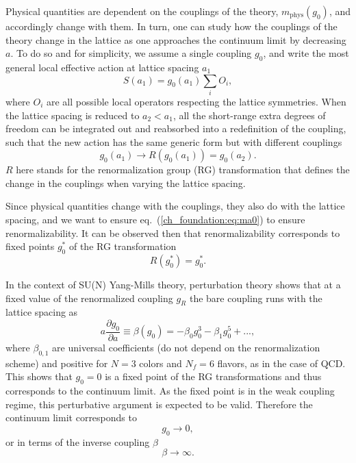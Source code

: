 Physical quantities are dependent on the couplings of the theory, $m_{\textrm{phys}}(g_0)$, and accordingly change with them. In turn, one can study how the couplings of the theory change in the lattice as one approaches the continuum limit by decreasing $a$. To do so and for simplicity, we assume a single coupling $g_0$, and write the most general local effective action at lattice spacing $a_1$
\begin{equation}
S(a_1)=g_0(a_1)\sum_i{O}_i,
\end{equation}
where ${O}_i$ are all possible local operators respecting the lattice symmetries. When the lattice spacing is reduced to $a_2<a_1$, all the short-range extra degrees of freedom can be integrated out and reabsorbed into a redefinition of the coupling, such that the new action has the same generic form but with different couplings
\begin{equation}
g_0(a_1)\rightarrow R(g_0(a_1))=g_0(a_2).
\end{equation}
$R$ here stands for the renormalization group (RG) transformation that defines the change in the couplings when varying the lattice spacing.

Since physical quantities change with the couplings, they also do with the lattice spacing, and we want to ensure eq.~(\ref{ch_foundation:eq:ma0}) to ensure renormalizability. It can be observed then that renormalizability corresponds to fixed points $g_0^*$ of the RG transformation
\begin{equation}
R(g_0^*)=g_0^*.
\end{equation}

In the context of SU(N) Yang-Mills theory, perturbation theory shows that at a fixed value of the renormalized coupling $g_R$ the bare coupling runs with the lattice spacing as
\begin{equation}
\label{ch_foundation:eq:beta-func}
a\frac{\partial g_0}{\partial a}\equiv\beta(g_0)=-\beta_0g_0^3-\beta_1g_0^5+...,
\end{equation}
where $\beta_{0,1}$ are universal coefficients (do not depend on the renormalization scheme) and positive for $N=3$ colors and $N_f=6$ flavors, as in the case of QCD. This shows that $g_0=0$ is a fixed point of the RG transformations and thus corresponds to the continuum limit. As the fixed point is in the weak coupling regime, this perturbative argument is expected to be valid. Therefore the continuum limit corresponds to
\begin{equation}
g_0\rightarrow0,
\end{equation}
or in terms of the inverse coupling $\beta$
\begin{equation}
\beta\rightarrow\infty.
\end{equation}

